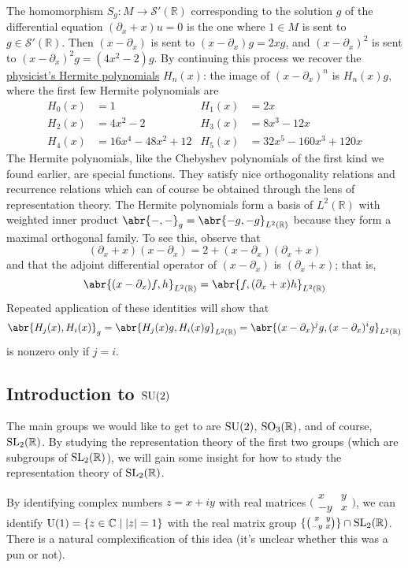 \documentclass[../../rtnotes.tex]{subfiles}
\begin{document}
The homomorphism $S_g\colon M\to \mathcal S'(\mathbb R)$ corresponding to the solution $g$ of the differential equation $(\partial_x+x)u = 0$ is the one where $1\in M$ is sent to $g\in \mathcal S'(\mathbb R)$. Then $(x-\partial_x)$ is sent to $(x-\partial_x)g = 2xg$, and $(x-\partial_x)^2$ is sent to $(x-\partial_x)^2g = (4x^2-2)g$. By continuing this process we recover the \href{https://en.wikipedia.org/wiki/Hermite_polynomials}{physicist's Hermite polynomials} $H_n(x)$: the image of $(x-\partial_x)^n$ is $H_n(x)g$, where the first few Hermite polynomials are
\begin{align*}
	H_0(x) &= 1 & H_1(x) &= 2x\\
	H_2(x) &= 4x^2-2& H_3(x) &=8x^3-12x \\
	H_4(x) &= 16x^4-48x^2+12& H_5(x) &= 32x^5-160x^3+120x
\end{align*}
The Hermite polynomials, like the Chebyshev polynomials of the first kind we found earlier, are special functions. They satisfy nice orthogonality relations and recurrence relations which can of course be obtained through the lens of representation theory. The Hermite polynomials form a basis of $L^2(\mathbb R)$ with weighted inner product $\abr{-,-}_g = \abr{-g,-g}_{L^2(\mathbb R)}$ because they form a maximal orthogonal family. To see this, observe that 
\[(\partial_x+x)(x-\partial_x) = 2 + (x-\partial_x)(\partial_x+x)\]
and that the adjoint differential operator of $(x-\partial_x)$ is $(\partial_x + x)$; that is,
\[\abr{(x-\partial_x)f,h}_{L^2(\mathbb R)} = \abr{f,(\partial_x+x)h}_{L^2(\mathbb R)}\]
Repeated application of these identities will show that
\[\abr{H_j(x),H_i(x)}_g = \abr{H_j(x)g,H_i(x)g}_{L^2(\mathbb R)} = \abr{(x-\partial_x)^jg,(x-\partial_x)^ig}_{L^2(\mathbb R)}\]
is nonzero only if $j = i$.

\subsection{Introduction to $\operatorname{SU}(2)$}
The main groups we would like to get to are $\operatorname{SU}(2)$, $\operatorname{SO}_3(\mathbb R)$, and of course, $\operatorname{SL}_2(\mathbb R)$. By studying the representation theory of the first two groups (which are subgroups of $\operatorname{SL}_2(\mathbb R)$), we will gain some insight for how to study the representation theory of $\operatorname{SL}_2(\mathbb R)$.

By identifying complex numbers $z = x+iy$ with real matrices $\bigl(\!\begin{smallmatrix}
	x & y \\ -y & x
\end{smallmatrix}\!\bigr)$, we can identify $\operatorname{U}(1) = \{z\in\mathbb C\mid \abs{z} = 1\}$ with the real matrix group $\{\bigl(\!\begin{smallmatrix}
	x & y \\ -y & x
\end{smallmatrix}\!\bigr)\}\cap\operatorname{SL}_2(\mathbb R)$. There is a natural complexification of this idea (it's unclear whether this was a pun or not).
\end{document}

